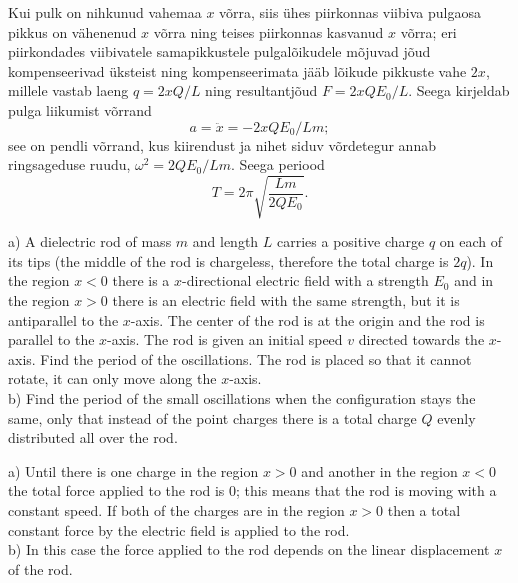 {\osa Kui pulk on nihkunud vahemaa $x$ võrra, siis ühes piirkonnas viibiva pulgaosa pikkus
on vähenenud $x$ võrra ning teises piirkonnas kasvanud $x$ võrra; eri piirkondades viibivatele
samapikkustele pulgalõikudele mõjuvad jõud kompenseerivad üksteist ning kompenseerimata jääb lõikude pikkuste vahe $2x$, millele vastab laeng
$q=2xQ/L$ ning resultantjõud $F=2xQE_0/L$.
Seega kirjeldab pulga liikumist võrrand
\[
a=\ddot x= -2xQE_0/Lm;
\]
see on pendli võrrand, kus kiirendust ja nihet siduv võrdetegur annab ringsageduse ruudu,
$\omega^2=2QE_0/Lm$. Seega periood 
\[ T=2\pi\sqrt{\frac{Lm}{2QE_0}}.\]
\fi


\ifEngStatement
a) A dielectric rod of mass $m$ and length $L$ carries a positive charge $q$ on each of its tips (the middle of the rod is chargeless, therefore the total charge is $2q$). In the region $x<0$ there is a $x$-directional electric field with a strength $E_0$ and in the region $x>0$ there is an electric field with the same strength, but it is antiparallel to the $x$-axis. The center of the rod is at the origin and the rod is parallel to the $x$-axis. The rod is given an initial speed $v$ directed towards the $x$-axis. Find the period of the oscillations. The rod is placed so that it cannot rotate, it can only move along the $x$-axis.\\
b) Find the period of the small oscillations when the configuration stays the same, only that instead of the point charges there is a total charge $Q$ evenly distributed all over the rod.
\fi


\ifEngHint
a) Until there is one charge in the region $x>0$ and another in the region $x<0$ the total force applied to the rod is 0; this means that the rod is moving with a constant speed. If both of the charges are in the region $x>0$ then a total constant force by the electric field is applied to the rod.\\
b) In this case the force applied to the rod depends on the linear displacement $x$ of the rod.
\fi


}
